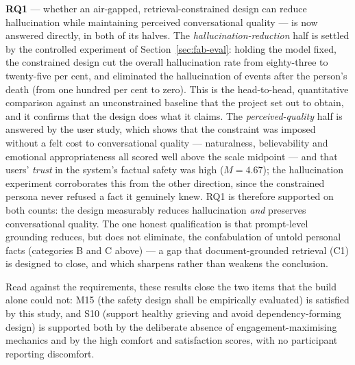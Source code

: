 \documentclass[11pt,a4paper]{report}
\begin{document}
\textbf{RQ1} --- whether an air-gapped, retrieval-constrained design can reduce hallucination while maintaining perceived conversational quality --- is now answered directly, in both of its halves. The \emph{hallucination-reduction} half is settled by the controlled experiment of Section~\ref{sec:fab-eval}: holding the model fixed, the constrained design cut the overall hallucination rate from eighty-three to twenty-five per cent, and eliminated the hallucination of events after the person's death (from one hundred per cent to zero). This is the head-to-head, quantitative comparison against an unconstrained baseline that the project set out to obtain, and it confirms that the design does what it claims. The \emph{perceived-quality} half is answered by the user study, which shows that the constraint was imposed without a felt cost to conversational quality --- naturalness, believability and emotional appropriateness all scored well above the scale midpoint --- and that users' \emph{trust} in the system's factual safety was high ($M=4.67$); the hallucination experiment corroborates this from the other direction, since the constrained persona never refused a fact it genuinely knew. RQ1 is therefore supported on both counts: the design measurably reduces hallucination \emph{and} preserves conversational quality. The one honest qualification is that prompt-level grounding reduces, but does not eliminate, the confabulation of untold personal facts (categories B and C above) --- a gap that document-grounded retrieval (C1) is designed to close, and which sharpens rather than weakens the conclusion.

Read against the requirements, these results close the two items that the build alone could not: M15 (the safety design shall be empirically evaluated) is satisfied by this study, and S10 (support healthy grieving and avoid dependency-forming design) is supported both by the deliberate absence of engagement-maximising mechanics and by the high comfort and satisfaction scores, with no participant reporting discomfort.
\end{document}
